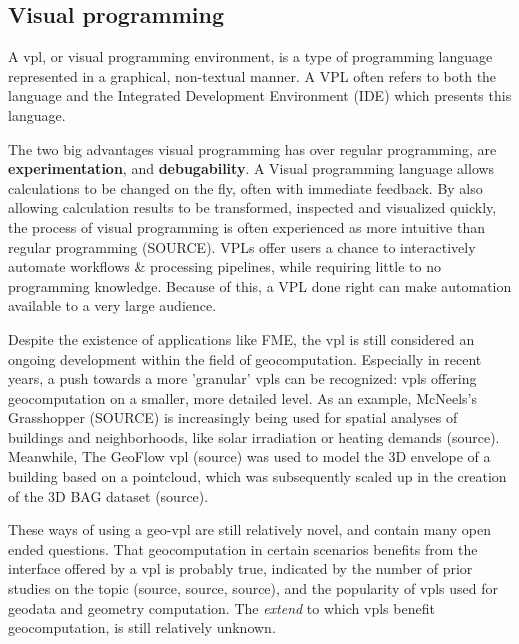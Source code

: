 \subsection*{Visual programming}


A \ac{vpl}, or visual programming environment, is a type of programming language represented in a graphical, non-textual manner.
A VPL often refers to both the language and the Integrated Development Environment (IDE) which presents this language.

The two big advantages visual programming has over regular programming, are \textbf{experimentation}, and \textbf{debugability}.
A Visual programming language allows calculations to be changed on the fly, often with immediate feedback. By also allowing calculation results to be transformed, inspected and visualized quickly, the process of visual programming is often experienced as more intuitive than regular programming (SOURCE).
VPLs offer users a chance to interactively automate workflows \& processing pipelines, while requiring little to no programming knowledge. 
Because of this, a VPL done right can make automation available to a very large audience.


Despite the existence of applications like FME, the \ac{vpl} is still considered an ongoing development within the field of geocomputation. 
Especially in recent years, a push towards a more 'granular' \ac{vpl}s can be recognized: 
\ac{vpl}s offering geocomputation on a smaller, more detailed level. 
As an example, McNeels's Grasshopper (SOURCE) is increasingly being used for spatial analyses of buildings and neighborhoods, like solar irradiation or heating demands (source). 
Meanwhile, The GeoFlow \ac{vpl} (source) was used to model the 3D envelope of a building based on a pointcloud, which was subsequently scaled up in the creation of the 3D BAG dataset (source).

These ways of using a \ac{geo-vpl} are still relatively novel, and contain many open ended questions. That geocomputation in certain scenarios benefits from the interface offered by a \ac{vpl} is probably true, indicated by the number of prior studies on the topic (source, source, source), and the popularity of \ac{vpl}s used for geodata and geometry computation. The \emph{extend} to which \ac{vpl}s benefit geocomputation, is still relatively unknown. 

